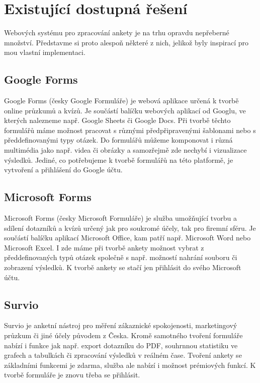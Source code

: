 \chapter{Existující dostupná řešení}

Webových systému pro zpracování ankety je na trhu opravdu nepřeberné množství. Představme si proto alespoň některé z nich, jelikož byly inspirací pro mou vlastní implementaci.

\section{Google Forms}

Google Forms (česky Google Formuláře) je webová aplikace určená k tvorbě online průzkumů a kvízů. Je součástí balíčku webových aplikací od Googlu, ve kterých nalezneme např. Google Sheets či Google Docs. Při tvorbě těchto formulářů máme možnost pracovat s různými předpřipravenými šablonami nebo s předdefinovanými typy otázek. Do formulářů můžeme komponovat i různá multimédia jako např. videa či obrázky a samozřejmě zde nechybí i vizualizace výsledků. Jediné, co potřebujeme k tvorbě formulářů na této platformě, je vytvoření a přihlášení do Google účtu. \cite{GoogleForms1}\cite{GoogleForms2}

\section{Microsoft Forms}
Microsoft Forms (česky Microsoft Formuláře) je služba umožňující tvorbu a sdílení dotazníků a kvízů určený jak pro soukromé účely, tak pro firemní sféru. Je součástí balíčku aplikací Microsoft Office, kam patří např. Microsoft Word nebo Microsoft Excel. I zde máme při tvorbě ankety možnost vybrat z předdefinovaných typů otázek společně s např. možností nahrání souboru či zobrazení výsledků. K tvorbě ankety se stačí jen přihlásit do svého Microsoft účtu. \cite{MSForms1} \cite{MSForms2}

\section{Survio}
Survio je anketní nástroj pro měření zákaznické spokojenosti, marketingový průzkum či jiné účely původem z Česka. Kromě samotného tvoření formuláře nabízí i funkce jak např. export dotazníku do PDF, souhrnnou statistiku ve grafech a tabulkách či zpracování výsledků v reálném čase. Tvoření ankety se základními funkcemi je zdarma, služba ale nabízí i možnost prémiových funkcí. K tvorbě formuláře je znovu třeba se přihlásit. \cite{Survio}

